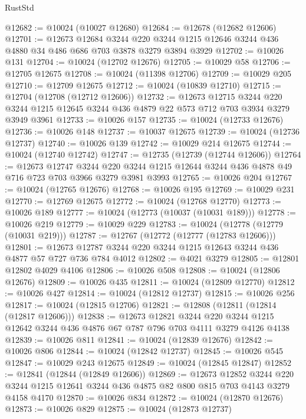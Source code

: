 \begin{lexlean}{RustStd}
\begin{coremodule}
{\begin{coremodule}
{{{{{{{{{{{{{{{{{{{{{{{{{{@12682 := @10024 (@10027 @12680)
@12684 := @12678 (@12682 @12606)
@12701 := @12673
    @12684
    @3244
    @220
    @3244
    @1215
    @12646
    @3244
    @436
    @4880
    @34
    @486
    @686
    @703
    @3878
    @3279
    @3894
    @3929
@12702 := @10026 @131
@12704 := @10024 (@12702 @12676)
@12705 := @10029 @58
@12706 := @12705 @12675
@12708 := @10024 (@11398 @12706)
@12709 := @10029 @205
@12710 := @12709 @12675
@12712 := @10024 (@10839 @12710)
@12715 := @12704 (@12708 (@12712 @12606))
@12732 := @12673
    @12715
    @3244
    @220
    @3244
    @1215
    @12645
    @3244
    @436
    @4879
    @22
    @573
    @712
    @703
    @3934
    @3279
    @3949
    @3961
@12733 := @10026 @157
@12735 := @10024 (@12733 @12676)
@12736 := @10026 @148
@12737 := @10037 @12675
@12739 := @10024 (@12736 @12737)
@12740 := @10026 @139
@12742 := @10029 @214 @12675
@12744 := @10024 (@12740 @12742)
@12747 := @12735 (@12739 (@12744 @12606))
@12764 := @12673
    @12747
    @3244
    @220
    @3244
    @1215
    @12644
    @3244
    @436
    @4878
    @49
    @716
    @723
    @703
    @3966
    @3279
    @3981
    @3993
@12765 := @10026 @204
@12767 := @10024 (@12765 @12676)
@12768 := @10026 @195
@12769 := @10029 @231
@12770 := @12769 @12675
@12772 := @10024 (@12768 @12770)
@12773 := @10026 @189
@12777 := @10024 (@12773 (@10037 (@10031 @189)))
@12778 := @10026 @219
@12779 := @10029 @229
@12783 := @10024 (@12778 (@12779 (@10031 @219)))
@12787 := @12767 (@12772 (@12777 (@12783 @12606)))
@12801 := @12673 @12787 @3244 @220 @3244 @1215 @12643 @3244 @436 @4877 @57 @727 @736 @784 @4012
@12802 := @4021 @3279
@12805 := @12801 @12802 @4029 @4106
@12806 := @10026 @508
@12808 := @10024 (@12806 @12676)
@12809 := @10026 @435
@12811 := @10024 (@12809 @12770)
@12812 := @10026 @427
@12814 := @10024 (@12812 @12737)
@12815 := @10026 @256
@12817 := @10024 (@12815 @12706)
@12821 := @12808 (@12811 (@12814 (@12817 @12606)))
@12838 := @12673
    @12821
    @3244
    @220
    @3244
    @1215
    @12642
    @3244
    @436
    @4876
    @67
    @787
    @796
    @703
    @4111
    @3279
    @4126
    @4138
@12839 := @10026 @811
@12841 := @10024 (@12839 @12676)
@12842 := @10026 @806
@12844 := @10024 (@12842 @12737)
@12845 := @10026 @545
@12847 := @10029 @243 @12675
@12849 := @10024 (@12845 @12847)
@12852 := @12841 (@12844 (@12849 @12606))
@12869 := @12673
    @12852
    @3244
    @220
    @3244
    @1215
    @12641
    @3244
    @436
    @4875
    @82
    @800
    @815
    @703
    @4143
    @3279
    @4158
    @4170
@12870 := @10026 @834
@12872 := @10024 (@12870 @12676)
@12873 := @10026 @829
@12875 := @10024 (@12873 @12737)
}}}}}}}}}}}}}}}}}}}}}}}}}}
\end{coremodule}}
\end{coremodule}
\end{lexlean}
